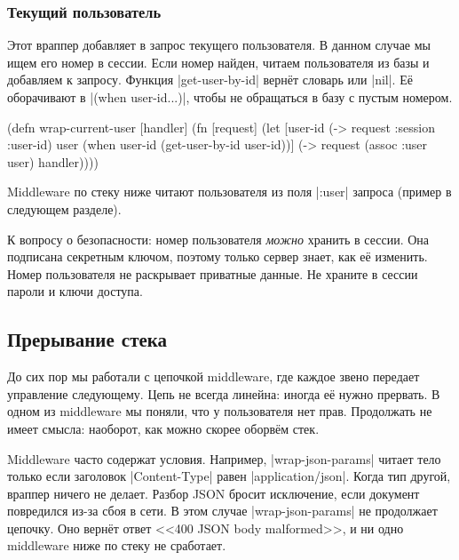 \subsubsection*{Текущий пользователь}


Этот враппер добавляет в запрос текущего пользователя. В данном случае мы ищем
его номер в сессии. Если номер найден, читаем пользователя из базы и добавляем к
запросу. Функция \spverb|get-user-by-id| верн\"{е}т словарь или
\spverb|nil|. Е\"{е} оборачивают в \spverb|(when user-id...)|, чтобы не
обращаться в базу с пустым номером.


\begin{english}
  \begin{clojure}
(defn wrap-current-user [handler]
  (fn [request]
    (let [user-id (-> request :session :user-id)
          user (when user-id
                 (get-user-by-id user-id))]
      (-> request
          (assoc :user user)
          handler))))
  \end{clojure}
\end{english}


Middleware по стеку ниже читают пользователя из поля \spverb|:user| запроса
(пример в следующем разделе).

К вопросу о безопасности: номер пользователя \emph{можно} хранить в сессии. Она
подписана секретным ключом, поэтому только сервер знает, как е\"{е}
изменить. Номер пользователя не раскрывает приватные данные. Не храните в сессии
пароли и ключи доступа.

\subsection{Прерывание стека}


До сих пор мы работали с цепочкой middleware, где каждое звено передает
управление следующему. Цепь не всегда линейна: иногда е\"{е} нужно прервать. В
одном из middleware мы поняли, что у пользователя нет прав. Продолжать не имеет
смысла: наоборот, как можно скорее оборв\"{е}м стек.


Middleware часто содержат условия. Например, \spverb|wrap-json-params| читает
тело только если заголовок \spverb|Content-Type| равен
\spverb|application/json|. Когда тип другой, враппер ничего не делает. Разбор
JSON бросит исключение, если документ повредился из-за сбоя в сети. В этом
случае \spverb|wrap-json-params| не продолжает цепочку. Оно верн\"{е}т ответ
<<400 JSON body malformed>>, и ни одно middleware ниже по стеку не сработает.

